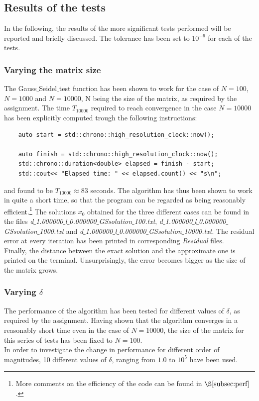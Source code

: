 \documentclass[11pt]{article}
\theoremstyle{theorem}
\theoremstyle{definition}
\begin{document}
\subsection{Results of the tests}
In the following, the results of the more significant tests performed will be reported and briefly discussed. The tolerance has been set to $10^{-6}$ for each of the tests.

\subsubsection{Varying the matrix size}
The Gauss$\_$Seidel$\_$test function has been shown to work for the case of $N=100$, $N=1000$ and $N=10000$, N being the size of the matrix, as required by the assignment.
The time $T_{10000}$ required to reach convergence in the case $N=10000$ has been explicitly computed trough the following instructions:

\begin{verbatim}
	auto start = std::chrono::high_resolution_clock::now();
	
	auto finish = std::chrono::high_resolution_clock::now();
	std::chrono::duration<double> elapsed = finish - start;
	std::cout<< "Elapsed time: " << elapsed.count() << "s\n";
\end{verbatim} 

and found to be $T_{10000}\approx 83$ seconds. The algorithm has thus been shown to work in quite a short time, so that the program can be regarded as being reasonably efficient.\footnote{More comments on the efficiency of the code can be found in $\S\ref{subsec:perf}$.} The solutions $x_0$ obtained for the three different cases can be found in the files \emph{d$\_$1.000000$\_$l$\_$0.000000$\_$GSsolution$\_$100.txt}, \emph{d$\_$1.000000$\_$l$\_$0.000000$\_$GSsolution$\_$1000.txt} and \emph{d$\_$1.000000$\_$l$\_$0.000000$\_$GSsolution$\_$10000.txt}. The residual error at every iteration has been printed in corresponding \emph{Residual} files.\\
Finally, the distance between the exact solution and the approximate one is printed on the terminal. Unsurprisingly, the error becomes bigger as the size of the matrix grows.\\

\subsubsection{Varying $\delta$}
The performance of the algorithm has been tested for different values of $\delta$, as required by the assignment. Having shown that the algorithm converges in a reasonably short time even in the case of $N=10000$, the size of the matrix for this series of tests has been fixed to $N=100$.\\
In order to investigate the change in performance for different order of magnitudes, 10 different values of $\delta$, ranging from $1.0$ to $10^5$ have been used.
\end{document}
